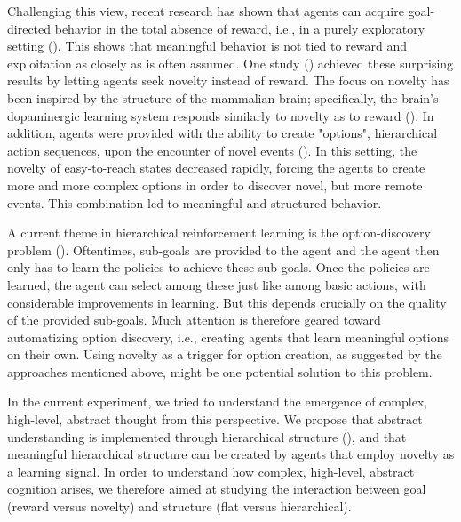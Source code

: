 \documentclass{article}
\begin{document}
Challenging this view, recent research has shown that agents can acquire goal-directed behavior in the total absence of reward, i.e., in a purely exploratory setting (\cite{machado_learning_2016, singh_intrinsically_2004, tessler_deep_2016}). This shows that meaningful behavior is not tied to reward and exploitation as closely as is often assumed. One study (\cite{singh_intrinsically_2004}) achieved these surprising results by letting agents seek novelty instead of reward. The focus on novelty has been inspired by the structure of the mammalian brain; specifically, the brain's dopaminergic learning system responds similarly to novelty as to reward (\cite{wittmann_striatal_2008}). In addition, agents were provided with the ability to create "options", hierarchical action sequences, upon the encounter of novel events (\cite{sutton_between_1999}). In this setting, the novelty of easy-to-reach states decreased rapidly, forcing the agents to create more and more complex options in order to discover novel, but more remote events. This combination led to meaningful and structured behavior. 

A current theme in hierarchical reinforcement learning is the option-discovery problem (\cite{botvinick_model-based_2014}). Oftentimes, sub-goals are provided to the agent and the agent then only has to learn the policies to achieve these sub-goals. Once the policies are learned, the agent can select among these just like among basic actions, with considerable improvements in learning. But this depends crucially on the quality of the provided sub-goals. Much attention is therefore geared toward automatizing option discovery, i.e., creating agents that learn meaningful options on their own. Using novelty as a trigger for option creation, as suggested by the approaches mentioned above, might be one potential solution to this problem. 

In the current experiment, we tried to understand the emergence of complex, high-level, abstract thought from this perspective. We propose that abstract understanding is implemented through hierarchical structure (\cite{botvinick_model-based_2014}), and that meaningful hierarchical structure can be created by agents that employ novelty as a learning signal. In order to understand how complex, high-level, abstract cognition arises, we therefore aimed at studying the interaction between goal (reward versus novelty) and structure (flat versus hierarchical).
\end{document}

